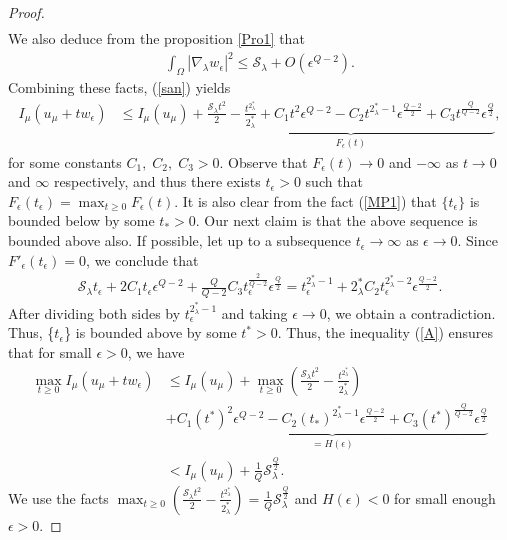 \documentclass[12pt, notitlepage]{article}
\begin{document}
{\begin{proof}
\begin{align}
\end{align}
We also deduce from the proposition \ref{Pro1} that
\begin{align}
    \int_\Omega|\nabla_\lambda w_\epsilon|^2\leq \mathcal{S}_\lambda+ O(\epsilon^{Q-2}).
\end{align}
Combining these facts, (\ref{san}) yields
\begin{align}\label{A}
    I_\mu(u_\mu+tw_\epsilon)&\leq  I_\mu(u_\mu)+\underbrace{\frac{\mathcal{S}_\lambda t^2}{2}-\frac{t^{2^*_\lambda}}{2^*_\lambda}+C_1t^2\epsilon^{Q-2}-C_2t^{2^*_\lambda-1} \epsilon^\frac{Q-2}{2}+C_3t^\frac{Q}{Q-2} \epsilon^\frac{Q}{2}}_{F_\epsilon(t)},
\end{align}
for some constants $C_1,\;C_2,\;C_3>0.$ Observe that $F_\epsilon(t)\to 0$ and $-\infty$ as $t\to 0$ and $\infty$ respectively, and thus there exists $t_\epsilon>0$ such that $F_\epsilon(t_\epsilon)=\max_{t\geq 0}F_\epsilon(t)$. It is also clear from the fact (\ref{MP1}) that $\{t_\epsilon\}$ is bounded below by some $t_*>0$. Our next claim is that the above sequence is bounded above also. If possible, let up to a subsequence $t_{\epsilon}\to\infty$ as $\epsilon\to 0$. Since $F'_{\epsilon}(t_\epsilon)=0$, we conclude that
\begin{align}
\mathcal{S}_\lambda t_\epsilon+2C_1t_\epsilon\epsilon^{Q-2}+\frac{Q}{Q-2}C_3t_\epsilon^\frac{2}{Q-2}\epsilon^\frac{Q}{2}=t_\epsilon^{2^*_\lambda-1}+{2^*_\lambda}C_2t_\epsilon^{2^*_\lambda-2} \epsilon^\frac{Q-2}{2}.    
\end{align}
After dividing both sides by $t_\epsilon^{2^*_\lambda-1}$ and taking $\epsilon\to 0$, we obtain a contradiction. Thus, \{$t_\epsilon$\} is bounded above by some $t^*>0$. Thus, the inequality (\ref{A}) ensures that for small $\epsilon>0$, we have
\begin{align}
   \max_{t\geq 0} I_\mu(u_\mu+tw_\epsilon)&\leq I_\mu(u_\mu)+\max_{t\geq 0}\left( \frac{\mathcal{S}_\lambda t^2}{2}-\frac{t^{2^*_\lambda}}{2^*_\lambda}\right )\nonumber\\
    &+\underbrace{C_1(t^*)^2\epsilon^{Q-2}-C_2(t_*)^{2^*_\lambda-1} \epsilon^\frac{Q-2}{2}+C_3(t^*)^\frac{Q}{Q-2} \epsilon^\frac{Q}{2}}_{=H(\epsilon)}\nonumber\\
    &< I_\mu(u_\mu)+\frac{1}{Q}\mathcal{S}_\lambda^\frac{Q}{2}.
\end{align}
 We use the facts $\max_{t\geq 0}\left( \frac{\mathcal{S}_\lambda t^2}{2}-\frac{t^{2^*_\lambda}}{2^*_\lambda}\right )=\frac{1}{Q}\mathcal{S}_\lambda^\frac{Q}{2}$ and $H(\epsilon)<0$ for small enough $\epsilon>0$. 

\end{proof}}
\end{document}

